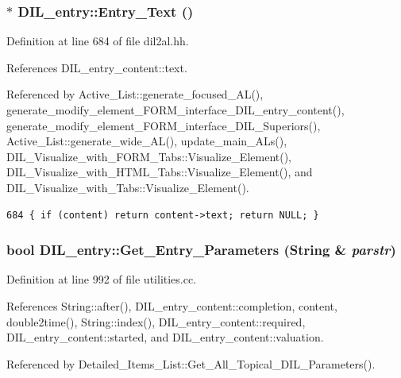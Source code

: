\subsubsection{$\ast$ DIL\_\-entry::Entry\_\-Text ()\hspace{0.3cm}{\tt  [inline]}}\label{classDIL__entry_a16}




Definition at line 684 of file dil2al.hh.

References DIL\_\-entry\_\-content::text.

Referenced by Active\_\-List::generate\_\-focused\_\-AL(), generate\_\-modify\_\-element\_\-FORM\_\-interface\_\-DIL\_\-entry\_\-content(), generate\_\-modify\_\-element\_\-FORM\_\-interface\_\-DIL\_\-Superiors(), Active\_\-List::generate\_\-wide\_\-AL(), update\_\-main\_\-ALs(), DIL\_\-Visualize\_\-with\_\-FORM\_\-Tabs::Visualize\_\-Element(), DIL\_\-Visualize\_\-with\_\-HTML\_\-Tabs::Visualize\_\-Element(), and DIL\_\-Visualize\_\-with\_\-Tabs::Visualize\_\-Element().



\footnotesize\begin{verbatim}684 { if (content) return content->text; return NULL; }
\end{verbatim}\normalsize 
{}
\subsubsection{\setlength{\rightskip}{0pt plus 5cm}bool DIL\_\-entry::Get\_\-Entry\_\-Parameters ({\bf String} \& {\em parstr})}\label{classDIL__entry_a17}




Definition at line 992 of file utilities.cc.

References String::after(), DIL\_\-entry\_\-content::completion, content, double2time(), String::index(), DIL\_\-entry\_\-content::required, DIL\_\-entry\_\-content::started, and DIL\_\-entry\_\-content::valuation.

Referenced by Detailed\_\-Items\_\-List::Get\_\-All\_\-Topical\_\-DIL\_\-Parameters().



